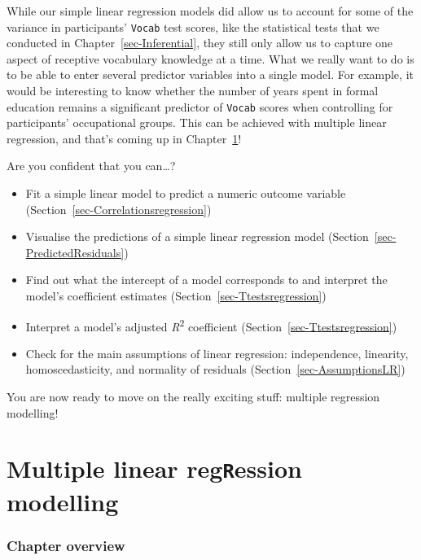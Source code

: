 \documentclass[
  letterpaper,
  DIV=11,
  numbers=noendperiod]{scrreprt}
\providecommand{\tightlist}{%
  \setlength{\itemsep}{0pt}\setlength{\parskip}{0pt}}
\begin{document}
While our simple linear regression models did allow us to account for
some of the variance in participants' \texttt{Vocab} test scores, like
the statistical tests that we conducted in
Chapter~\ref{sec-Inferential}, they still only allow us to capture one
aspect of receptive vocabulary knowledge at a time. What we really want
to do is to be able to enter several predictor variables into a single
model. For example, it would be interesting to know whether the number
of years spent in formal education remains a significant predictor of
\texttt{Vocab} scores when controlling for participants' occupational
groups. This can be achieved with multiple linear regression, and that's
coming up in Chapter~\ref{sec-MLR}!

Are you confident that you can\ldots?

\begin{itemize}
\tightlist
\item[$\square$]
  Fit a simple linear model to predict a numeric outcome variable
  (Section~\ref{sec-Correlationsregression})
\item[$\square$]
  Visualise the predictions of a simple linear regression model
  (Section~\ref{sec-PredictedResiduals})
\item[$\square$]
  Find out what the intercept of a model corresponds to and interpret
  the model's coefficient estimates (Section~\ref{sec-Ttestsregression})
\item[$\square$]
  Interpret a model's adjusted \emph{R}\textsuperscript{2} coefficient
  (Section~\ref{sec-Ttestsregression})
\item[$\square$]
  Check for the main assumptions of linear regression: independence,
  linearity, homoscedasticity, and normality of residuals
  (Section~\ref{sec-AssumptionsLR})
\end{itemize}

You are now ready to move on the really exciting stuff: multiple
regression modelling! 


\chapter{\texorpdfstring{Multiple linear reg\texttt{R}ession
modelling}{Multiple linear regRession modelling}}\label{sec-MLR}

\subsection*{Chapter overview}\label{chapter-overview-12}
\end{document}
